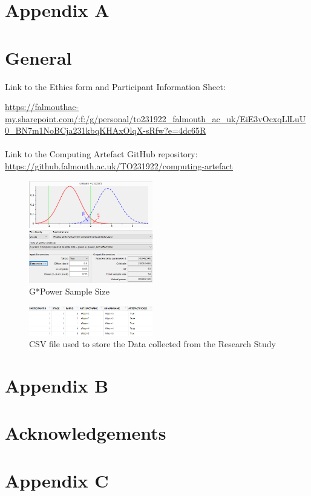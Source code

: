 \newpage
\section*{Appendix A} \label{append:a}
\section*{General}
Link to the Ethics form and Participant Information Sheet:

\url{https://falmouthac-my.sharepoint.com/:f:/g/personal/to231922_falmouth_ac_uk/EiE3vOcxqLlLuU0_BN7m1NoBCja231kbqKHAxOlqX-sRfw?e=4dc65R}
\\
\\
Link to the Computing Artefact GitHub repository: 
\url{https://github.falmouth.ac.uk/TO231922/computing-artefact}
\begin{figure}[ht]
    \includegraphics[width=0.48\textwidth]{./Images/gpower.png}
    \centering
    \caption{G*Power Sample Size}
    \label{gpower}
\end{figure}
\begin{figure}[ht]
    \includegraphics[width=0.48\textwidth]{./Images/csv-image.png}
    \centering
    \caption{CSV file used to store the Data collected from the Research Study}
    \label{csv-file}
\end{figure}

\newpage
\section*{Appendix B}
\section*{Acknowledgements}
\label{append:b}

\newpage
\section*{Appendix C}
